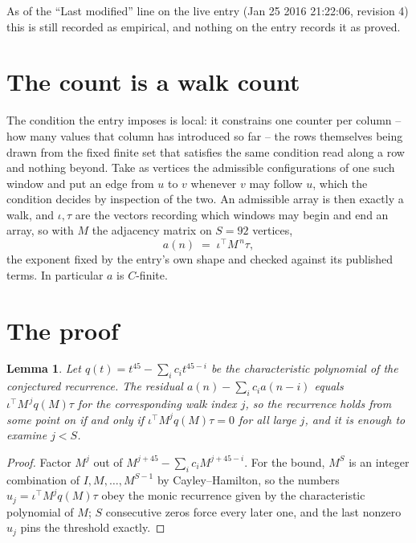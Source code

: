 \documentclass[11pt,a4paper]{article}
\theoremstyle{plain}
\newtheorem{lemma}[theorem]{Lemma}
\theoremstyle{definition}
\begin{document}
As of the ``Last modified'' line on the live entry (Jan 25 2016 21:22:06, revision 4) this is still
recorded as empirical, and nothing on the entry records it as proved.

\section{The count is a walk count}

The condition the entry imposes is local: it constrains one counter per column -- how many values that column has introduced so far -- the rows themselves being drawn from the fixed finite set that satisfies the same condition read along a row and nothing beyond. Take as vertices the admissible configurations of one such window and put an edge from $u$ to $v$ whenever $v$ may follow $u$, which the condition decides by inspection of the two.
An admissible array is then exactly a walk, and $\iota,\tau$ are the vectors recording which windows may begin and end an array, so with $M$ the adjacency matrix on $S=92$ vertices,
\[
a(n)\;=\;\iota^{\!\top}M^{\,n}\tau ,
\]
the exponent fixed by the entry's own shape and checked against its published terms. In
particular $a$ is $C$-finite.

\section{The proof}

\begin{lemma}\label{lem:crit}
Let $q(t)=t^{45}-\sum_i c_it^{45-i}$ be the characteristic polynomial of the
conjectured recurrence. The residual $a(n)-\sum_ic_ia(n-i)$ equals
$\iota^{\!\top}M^{\,j}q(M)\tau$ for the corresponding walk index $j$, so the recurrence
holds from some point on if and only if $\iota^{\!\top}M^{j}q(M)\tau=0$ for all large $j$,
and it is enough to examine $j<S$.
\end{lemma}

\begin{proof}
Factor $M^{j}$ out of $M^{j+45}-\sum_ic_iM^{j+45-i}$. For the bound, $M^{S}$
is an integer combination of $I,M,\dots,M^{S-1}$ by Cayley--Hamilton, so the numbers
$u_j=\iota^{\!\top}M^{j}q(M)\tau$ obey the monic recurrence given by the characteristic
polynomial of $M$; $S$ consecutive zeros force every later one, and the last nonzero $u_j$
pins the threshold exactly.
\end{proof}
\end{document}
